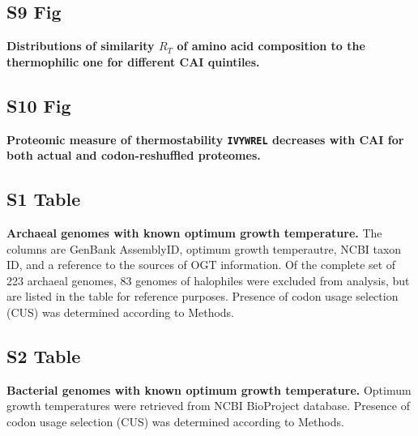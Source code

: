 \documentclass[10pt,letterpaper]{article}
\begin{document}
\subsection*{S9 Fig}
\label{fig:s9}
{\bf Distributions of similarity $R_T$ of amino acid composition to the thermophilic one for different CAI quintiles.}

\subsection*{S10 Fig}
\label{fig:s10}
{\bf Proteomic measure of thermostability \texttt{IVYWREL} decreases with CAI for both actual and codon-reshuffled proteomes.}


\subsection*{S1 Table}
\label{table:s1}
{\bf Archaeal genomes with known optimum growth temperature.}
The columns are  GenBank AssemblyID, optimum growth temperautre, NCBI taxon ID, and a reference to the sources of OGT information. Of the complete set of 223 archaeal genomes, 83 genomes of halophiles were excluded from analysis, but are listed in the table for reference purposes. Presence of codon usage selection (CUS) was determined according to Methods.

\subsection*{S2 Table}
\label{table:s2}
{\bf Bacterial genomes with known optimum growth temperature.}
Optimum growth temperatures were retrieved from NCBI BioProject database. Presence of codon usage selection (CUS) was determined according to Methods.




\end{document}
